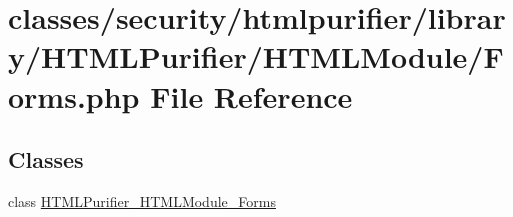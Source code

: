 \hypertarget{Forms_8php}{\section{classes/security/htmlpurifier/library/\+H\+T\+M\+L\+Purifier/\+H\+T\+M\+L\+Module/\+Forms.php File Reference}
\label{Forms_8php}
}
\subsection*{Classes}
\begin{DoxyCompactItemize}
\item 
class \hyperlink{classHTMLPurifier__HTMLModule__Forms}{H\+T\+M\+L\+Purifier\+\_\+\+H\+T\+M\+L\+Module\+\_\+\+Forms}
\end{DoxyCompactItemize}
